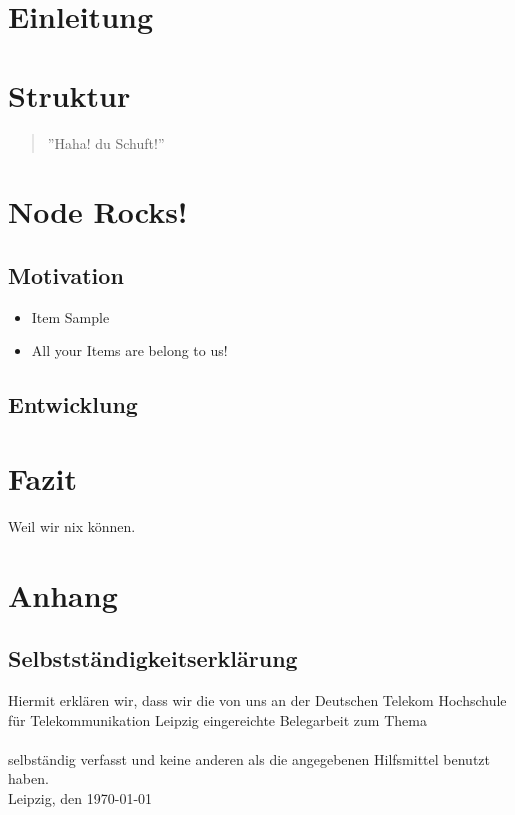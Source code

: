\documentclass[a4paper,ngerman,12pt]{scrreprt}
\begin{document}
\begingroup
\renewcommand*{\chapterpagestyle}{empty}
\pagestyle{empty}
\tableofcontents
\clearpage
\endgroup

\chapter{Einleitung}


\chapter{Struktur}
 
\begin{quote}
	''Haha! du Schuft!''
\end{quote}

\chapter{Node Rocks!}

\section{Motivation}

\begin{itemize}
\item Item Sample
\item All your Items are belong to us!
\end{itemize}

\section{Entwicklung}




\chapter{Fazit}
Weil wir nix können.

\begingroup
\let\clearpage\relax
\chapter{Anhang}
\printbibliography
\endgroup
\vfill

\section*{Selbstständigkeitserklärung}
Hiermit erklären wir, dass wir die von uns an der Deutschen Telekom Hochschule für Telekommunikation Leipzig eingereichte Belegarbeit zum Thema\\[1cm]
\centering \\[1cm]
selbständig verfasst und keine anderen als die angegebenen Hilfsmittel benutzt haben.
\\[1.5cm]
\flushleft Leipzig, den \today
\end{document}
